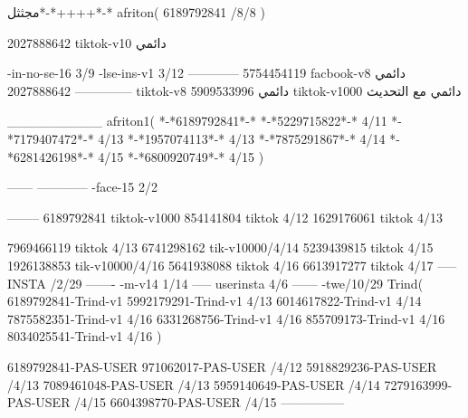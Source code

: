 مجثثل*-*++++*-*
afriton(
6189792841 /8/8
)

2027888642 tiktok-v10
دائمي

-in-no-se-16 3/9
-lse-ins-v1 3/12
------------
5754454119 facbook-v8
دائمي
--------------
2027888642 tiktok-v8
دائمي
5909533996 tiktok-v1000
دائمي مع التحديث

__________
afriton1(
*-*6189792841*-*
*-*5229715822*-* 4/11
*-*7179407472*-* 4/13
*-*1957074113*-* 4/13
*-*7875291867*-* 4/14
*-*6281426198*-* 4/15
*-*6800920749*-* 4/15
)


------
------------
-face-15 2/2

--------
6189792841 tiktok-v1000
854141804 tiktok 4/12
1629176061 tiktok 4/13

7969466119 tiktok 4/13
6741298162 tik-v10000/4/14
5239439815 tiktok 4/15
1926138853 tik-v10000/4/16
5641938088 tiktok 4/16
6613917277 tiktok 4/17
-----
 INSTA /2/29
-------
-m-v14 1/14
-----
userinsta 4/6
------
-twe/10/29
Trind(
6189792841-Trind-v1 
5992179291-Trind-v1  4/13
6014617822-Trind-v1  4/14
7875582351-Trind-v1  4/16
6331268756-Trind-v1  4/16
855709173-Trind-v1  4/16
8034025541-Trind-v1  4/16
)

6189792841-PAS-USER
971062017-PAS-USER /4/12
5918829236-PAS-USER /4/13
7089461048-PAS-USER /4/13
5959140649-PAS-USER /4/14
7279163999-PAS-USER /4/15
6604398770-PAS-USER /4/15
    ---------------
